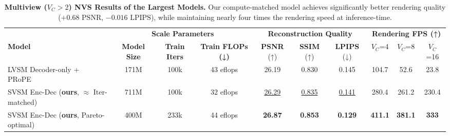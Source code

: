 \begin{table}[t]
  \centering
  \begin{threeparttable}
    \scriptsize
    \setlength{\tabcolsep}{3pt} %

    \begin{subtable}{\linewidth}
      \begin{tabular*}{\linewidth}{@{\extracolsep{\fill}} l *{9}{c}}
        \toprule
        
        & \multicolumn{3}{c}{\textbf{Scale Parameters}}
        & \multicolumn{3}{c}{\textbf{Reconstruction Quality}}
        & \multicolumn{3}{c}{\textbf{Rendering FPS (↑)}} \\
        
        \cmidrule(lr){2-4} \cmidrule(lr){5-7} \cmidrule(lr){8-10}
        
        \textbf{Model} 
        & \textbf{Model Size} & \textbf{Train Iters} & \textbf{Train FLOPs (↓)}  
        & \textbf{PSNR} (↑) & \textbf{SSIM} (↑) & \textbf{LPIPS} (↓)
        & $V_C$=4  & $V_C$=8  & $V_C$=16\\
        
        \midrule
        
        
        LVSM Decoder-only + PRoPE~\citep{jin2024lvsm,li2025cameras}
        & 171M & 100k & 43 eflops 
        & 26.19 & 0.830 & 0.145
        & 104.7 & 52.6 & 23.8 \\
        
        SVSM Enc-Dec (\textbf{ours}, $\approx$ Iter-matched)
        & 711M & 100k & 32 eflops
        & \underline{26.29} & \underline{0.835} & \underline{0.141} 
        & 280.4 & 261.2 & 230.4 \\

        SVSM Enc-Dec (\textbf{ours}, Pareto-optimal)
        & 400M & 233k & 44 eflops
        & \textbf{26.87} & \textbf{0.853} & \textbf{0.129}
        & \textbf{411.1} & \textbf{381.1} & \textbf{333} \\
        
        \bottomrule
      \end{tabular*}
    \end{subtable}

    \caption{
        \textbf{Multiview (}$V_C{>}2$\textbf{) NVS Results of the Largest Models.} Our compute-matched model achieves significantly better rendering quality ($+0.68\text{ PSNR}$, $-0.016\text{ LPIPS}$), while maintaining nearly four times the rendering speed at inference-time.
    }
    \label{tab:multiview-result} %
  \end{threeparttable}
\end{table}